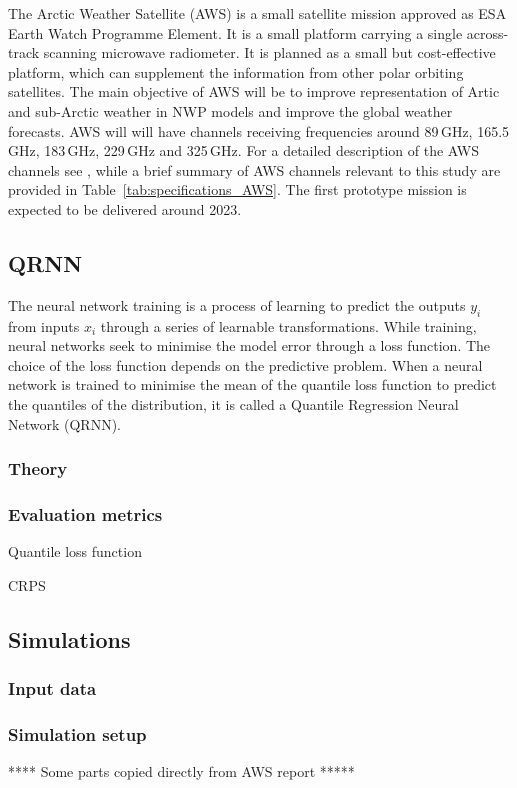 \documentclass[amt, manuscript]{copernicus}
\begin{document}
The Arctic Weather Satellite (AWS) is a small satellite mission approved as ESA
Earth Watch Programme Element. It is a small platform carrying a single
across-track scanning microwave radiometer. It is planned as a small but cost-effective platform, which can supplement the information from other polar orbiting satellites. The main objective of AWS will be to improve representation of Artic and sub-Arctic weather in NWP models and improve the global weather forecasts. AWS will will have channels receiving frequencies around 89\,GHz, 165.5\,GHz, 183\,GHz, 229\,GHz and 325\,GHz. For a detailed description of the AWS channels see \citet{eriksson2020study}, while a brief summary of AWS channels relevant to this study are provided in
Table~\ref{tab:specifications_AWS}. The first prototype mission is expected to be delivered around 2023. 

\subsection{QRNN}
%
The neural network training is a process of learning to predict the outputs {$y_i$} from inputs {$x_i$} through a series of learnable transformations. While training, neural networks seek to minimise the model error through a loss function. The choice of the loss function depends on the predictive problem. When a neural network is trained to minimise the mean of the quantile loss function to predict the quantiles of the distribution, it is called a Quantile Regression Neural Network (QRNN). 
\subsubsection{Theory}

\subsubsection{Evaluation metrics}

Quantile loss function

CRPS

\subsection{Simulations}
\label{sec:arts_simulations}
%
\subsubsection{Input data}
%
\subsubsection{Simulation setup}
%
**** Some parts copied directly from AWS report *****
\end{document}
